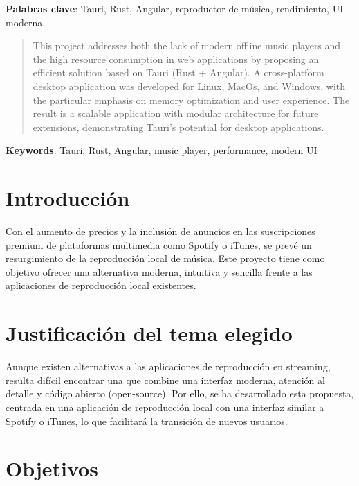 \documentclass[11pt, a4paper]{article}
\begin{document}
\noindent \textbf{Palabras clave}: Tauri, Rust, Angular, reproductor de música, rendimiento, UI moderna.

\begin{abstract}
    This project addresses both the lack of modern offline music players and the high resource consumption in web applications by proposing an efficient solution based on Tauri (Rust + Angular). A cross-platform desktop application was developed for Linux, MacOs, and Windows, with the particular emphasis on memory optimization and user experience. The result is a scalable application with modular architecture for future extensions, demonstrating Tauri's potential for desktop applications.
\end{abstract}

\noindent \textbf{Keywords}: Tauri, Rust, Angular, music player, performance, modern UI


\clearpage

\tableofcontents
\listoffigures
\listoftables


\clearpage


\setcounter{page}{1}
\section{Introducción}

Con el aumento de precios y la inclusión de anuncios en las suscripciones premium de plataformas multimedia como Spotify o iTunes, se prevé un resurgimiento de la reproducción local de música. Este proyecto tiene como objetivo ofrecer una alternativa moderna, intuitiva y sencilla frente a las aplicaciones de reproducción local existentes.


\section{Justificación del tema elegido}

Aunque existen alternativas a las aplicaciones de reproducción en streaming, resulta difícil encontrar una que combine una interfaz moderna, atención al detalle y código abierto (open-source). Por ello, se ha desarrollado esta propuesta, centrada en una aplicación de reproducción local con una interfaz similar a Spotify o iTunes, lo que facilitará la transición de nuevos usuarios.

\section{Objetivos}
\end{document}
